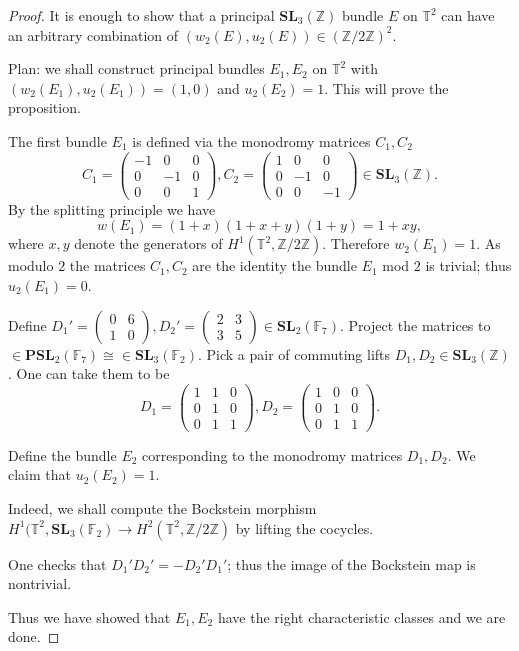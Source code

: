 \documentclass[a4paper]{article}
\newcommand{\SL}{\mathbf{SL}_3(\mathbb{Z})}        %
\begin{document}
\begin{proof}
It is enough to show that a principal $\SL$ bundle $E$ on $\mathbb{T}^2$ can have an arbitrary combination of $(w_2(E), u_2(E)) \in (\mathbb{Z}/ 2\mathbb{Z})^2$.

Plan: we shall construct principal bundles $E_1, E_2$ on $\mathbb{T}^2$ with $(w_2(E_1), u_2(E_1)) = (1, 0)$ and $u_2(E_2) = 1$.
This will prove the proposition.

The first bundle $E_1$ is defined via the monodromy matrices $C_1, C_2$
\[
C_1 = 
\begin{pmatrix}
-1 & 0 & 0 \\
0 & -1 & 0 \\
0 & 0 & 1
\end{pmatrix}
,
C_2 =
\begin{pmatrix}
1 & 0 & 0 \\
0 & -1 & 0 \\
0 & 0 & -1
\end{pmatrix} \in \SL
.\] 
By the splitting principle we have
\[
w(E_1)
= (1 + x) (1 + x + y) (1 + y) 
= 1 + xy
,\] 
where $x, y$ denote the generators of $H^1(\mathbb{T}^2, \mathbb{Z}/ 2 \mathbb{Z})$.
Therefore $w_2(E_1) = 1$.
As modulo $2$ the matrices $C_1, C_2$ are the identity the bundle $E_1$ mod $2$ is trivial; thus $u_2(E_1) = 0$.

Define $D_1' = 
\left( \begin{smallmatrix}0&6\\1&0\end{smallmatrix}\right) 
, D_2' =
\left( \begin{smallmatrix}2&3\\3&5\end{smallmatrix}\right)
\in \mathbf{SL}_2(\mathbb{F}_7)$.
Project the matrices to 
$\in \mathbf{PSL}_2(\mathbb{F}_7) \cong \in \mathbf{SL}_3(\mathbb{F}_2) $.
Pick a pair of commuting lifts $D_1, D_2 \in \mathbf{SL}_3(\mathbb{Z})$.
One can take them to be 
\begin{equation}
D_1 = 
\begin{pmatrix}
1 & 1 & 0 \\
0 & 1 & 0 \\
0 & 1 & 1
\end{pmatrix}, 
D_2 =
\begin{pmatrix}
1 & 0 & 0 \\
0 & 1 & 0 \\
0 & 1 & 1
\end{pmatrix}
.\end{equation}

Define the bundle $E_2$ corresponding to the monodromy matrices $D_1, D_2$. 
We claim that $u_2(E_2) = 1$.

Indeed, we shall compute the Bockstein morphism $H^1(\mathbb{T}^2, \mathbf{SL}_3(\mathbb{F}_2) \to H^2(\mathbb{T}^2, \mathbb{Z}/ 2 \mathbb{Z})$ by lifting the cocycles.

One checks that $D_1' D_2' = - D_2' D_1'$; thus the image of the Bockstein map is nontrivial.

Thus we have showed that $E_1, E_2$ have the right characteristic classes and we are done.
\end{proof}
\end{document}
